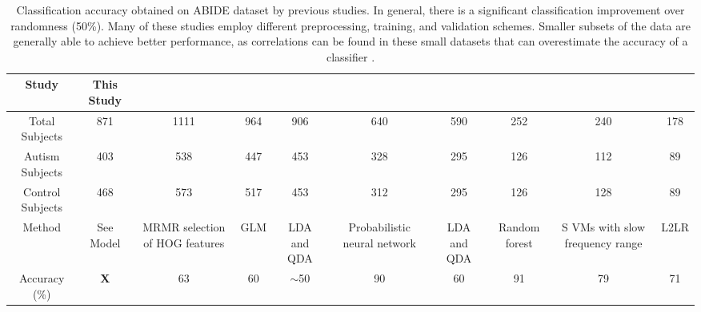 \documentclass{article}
\begin{document}
\begin{table}[ht]
	\caption{Classification accuracy obtained on ABIDE dataset by previous studies. In general, there is a significant classification improvement over randomness (50\%). Many of these studies employ different preprocessing, training, and validation schemes. Smaller subsets of the data are generally able to achieve better performance, as correlations can be found in these small datasets that can overestimate the accuracy of a classifier \cite{haar2014anatomical}.}
	\label{background_table}
	\vskip 0.15in
	\begin{center}
		\begin{small}
			\begin{sc}
				\scriptsize
				\begin{tabulary}{\textwidth}{CCCCCCCCCC}
					\hline
					\abovespace\belowspace
					Study & \textbf{This Study} & \citet{ghiassian2013learning} & \citet{nielsen2013multisite}& \citet{haar2014anatomical} & \citet{iidaka2015resting}& \citet{haar2014anatomical} & \citet{chen2015diagnostic} & \citet{chen2016multivariate} & \citet{plitt2015functional}\\
					\hline
					Total Subjects & 871 & 1111 & 964  & 906 & 640 & 590& 252 & 240 & 178 \\ \hline
					Autism Subjects & 403 & 538 & 447  & 453 & 328 & 295& 126 & 112 & 89 \\ \hline
					Control Subjects  & 468 & 573 & 517& 453 & 312 & 295 & 126 & 128 & 89 \\ \hline
					Method & See Model & MRMR selection of HOG features & GLM &  LDA and QDA & Probabilistic neural network & LDA and QDA & Random forest & S	VMs with slow frequency range & L2LR \\ \hline
					\belowspace
					Accuracy (\%) & \textbf{X} & 63 & 60 & $\sim$50 & 90& 60 & 91 & 79 & 71 \\ 
					\hline
				\end{tabulary}
			\end{sc}
		\end{small}
	\end{center}
	\vskip -0.1in
\end{table}
\FloatBarrier
\end{document}

